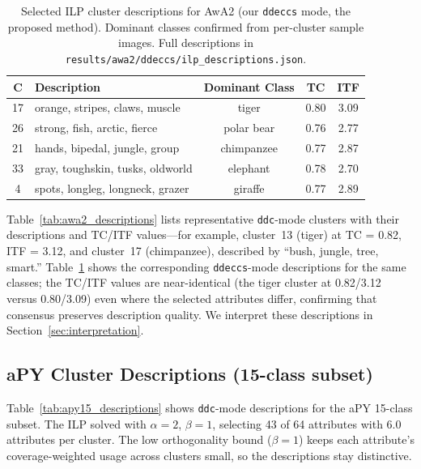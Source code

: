 
\begin{table}[H]
    \centering
    \caption{Selected ILP cluster descriptions for AwA2 (our \texttt{ddeccs} mode, the proposed method). Dominant classes confirmed from per-cluster sample images. Full descriptions in \texttt{results/awa2/ddeccs/ilp\_descriptions.json}.}
    \label{tab:awa2_descriptions_ddeccs}
    \begin{tabular}{clccc}
        \hline
        \textbf{C} & \textbf{Description} & \textbf{Dominant Class} & \textbf{TC} & \textbf{ITF} \\
        \hline
        17 & orange, stripes, claws, muscle & tiger & 0.80 & 3.09 \\
        26 & strong, fish, arctic, fierce & polar bear & 0.76 & 2.77 \\
        21 & hands, bipedal, jungle, group & chimpanzee & 0.77 & 2.87 \\
        33 & gray, toughskin, tusks, oldworld & elephant & 0.78 & 2.70 \\
        4 & spots, longleg, longneck, grazer & giraffe & 0.77 & 2.89 \\
        \hline
    \end{tabular}
\end{table}

Table~\ref{tab:awa2_descriptions} lists representative \texttt{ddc}-mode clusters with their descriptions and TC/ITF values---for example, cluster~13 (tiger) at TC = 0.82, ITF = 3.12, and cluster~17 (chimpanzee), described by ``bush, jungle, tree, smart.'' Table~\ref{tab:awa2_descriptions_ddeccs} shows the corresponding \texttt{ddeccs}-mode descriptions for the same classes; the TC/ITF values are near-identical (the tiger cluster at 0.82/3.12 versus 0.80/3.09) even where the selected attributes differ, confirming that consensus preserves description quality. We interpret these descriptions in Section~\ref{sec:interpretation}.

\subsection{aPY Cluster Descriptions (15-class subset)}

Table~\ref{tab:apy15_descriptions} shows \texttt{ddc}-mode descriptions for the aPY 15-class subset. The ILP solved with $\alpha = 2$, $\beta = 1$, selecting 43 of 64 attributes with 6.0 attributes per cluster. The low orthogonality bound ($\beta = 1$) keeps each attribute's coverage-weighted usage across clusters small, so the descriptions stay distinctive.

